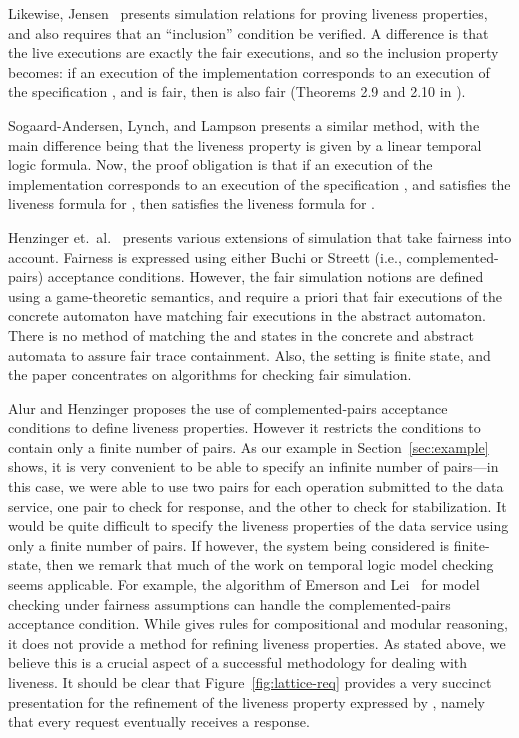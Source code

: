 \documentclass[11pt]{article}
\begin{document}
Likewise, Jensen~\cite{Jen99} presents simulation relations for 
proving liveness properties, and also requires that an ``inclusion''
condition be verified. A difference is that the live executions are
exactly the fair executions, and so the inclusion property becomes:
if an execution  of the implementation 
corresponds to an execution  of the specification ,
and  is fair, then  is also fair 
(Theorems 2.9 and 2.10 in \cite{Jen99}).

Sogaard-Andersen, Lynch, and Lampson \cite{SLL93} presents a similar
method, with the main difference being that the liveness property is
given by a linear temporal logic formula. Now, the proof obligation is
that if an execution  of the implementation  corresponds to
an execution  of the specification , and 
satisfies the liveness formula for , then  satisfies the
liveness formula for .




Henzinger et.~al.~\cite{HKR97} presents various extensions of
simulation that take fairness into account.  Fairness is expressed
using either Buchi or Streett (i.e., complemented-pairs) acceptance
conditions. However, the fair simulation notions are defined using a
game-theoretic semantics, and require a priori that fair executions of
the concrete automaton have matching fair executions in the abstract
automaton. There is no method of matching the  and 
states in the concrete and abstract automata to assure fair trace
containment. Also, the setting is finite state, and the paper
concentrates on algorithms for checking fair simulation.


Alur and Henzinger \cite{AH95} proposes the use of complemented-pairs acceptance
conditions to define liveness properties. However it restricts the
conditions to contain only a finite number of pairs. As our example in
Section~\ref{sec:example} shows, it is very convenient to be able to
specify an infinite number of pairs---in this case, we were able to
use two pairs for each operation  submitted to the data service,
one pair to check for response, and the other to check for
stabilization. It would be quite difficult to specify the liveness
properties of the data service using only a finite number of pairs.
If however, the system being considered is finite-state, then we
remark that much of the work on temporal logic model
checking seems applicable. For example, the algorithm
of Emerson and Lei~\cite{EL85} for model checking under fairness assumptions can
handle the complemented-pairs acceptance condition.
While \cite{AH95} gives rules for compositional and modular
reasoning, it does not provide a method for refining liveness
properties. As stated above, we believe this is a crucial aspect of a
successful methodology for dealing with liveness. It should be clear
that Figure~\ref{fig:lattice-req} provides a very succinct
presentation for the refinement of the liveness property expressed by
, namely that every request
eventually receives a response.
\end{document}
